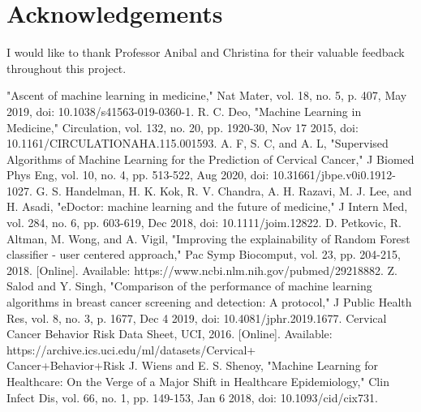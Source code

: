 \documentclass[10pt, oneside, twocolumn]{article}
\begin{document}
\section{Acknowledgements}
I would like to thank Professor Anibal and Christina for their valuable feedback throughout this project.

\begin{thebibliography}{8}
 "Ascent of machine learning in medicine," Nat Mater, vol. 18, no. 5, p. 407, May 2019, doi: 10.1038/s41563-019-0360-1.
 R. C. Deo, "Machine Learning in Medicine," Circulation, vol. 132, no. 20, pp. 1920-30, Nov 17 2015, doi: 10.1161/CIRCULATIONAHA.115.001593.
 A. F, S. C, and A. L, "Supervised Algorithms of Machine Learning for the Prediction of Cervical Cancer," J Biomed Phys Eng, vol. 10, no. 4, pp. 513-522, Aug 2020, doi: 10.31661/jbpe.v0i0.1912-1027.
 G. S. Handelman, H. K. Kok, R. V. Chandra, A. H. Razavi, M. J. Lee, and H. Asadi, "eDoctor: machine learning and the future of medicine," J Intern Med, vol. 284, no. 6, pp. 603-619, Dec 2018, doi: 10.1111/joim.12822.
 D. Petkovic, R. Altman, M. Wong, and A. Vigil, "Improving the explainability of Random Forest classifier - user centered approach," Pac Symp Biocomput, vol. 23, pp. 204-215, 2018. [Online]. Available: https://www.ncbi.nlm.nih.gov/pubmed/29218882.
 Z. Salod and Y. Singh, "Comparison of the performance of machine learning algorithms in breast cancer screening and detection: A protocol," J Public Health Res, vol. 8, no. 3, p. 1677, Dec 4 2019, doi: 10.4081/jphr.2019.1677.
 Cervical Cancer Behavior Risk Data Sheet, UCI, 2016. [Online]. Available: https://archive.ics.uci.edu/ml/datasets/Cervical+\\Cancer+Behavior+Risk 
 J. Wiens and E. S. Shenoy, "Machine Learning for Healthcare: On the Verge of a Major Shift in Healthcare Epidemiology," Clin Infect Dis, vol. 66, no. 1, pp. 149-153, Jan 6 2018, doi: 10.1093/cid/cix731.
\end{thebibliography}
\end{document}
